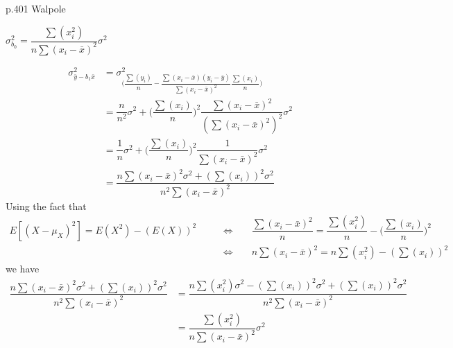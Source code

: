 p.401 Walpole\\[2ex]
\begin{center}
    $\sigma_{b_{0}}^{2} = \dfrac{\sum(x_{i}^{2})}{n\sum(x_{i} - \bar{x})^{2}}\sigma^{2}$
\end{center}
\begin{align*}
    \sigma_{\bar{y} - b_{1}\bar{x}}^{2} &= \sigma_{\Big(\dfrac{\sum(y_{i})}{n} - \dfrac{\sum(x_{i} - \bar{x})(y_{i} - \bar{y})}{\sum(x_{i} - \bar{x})^{2}}\dfrac{\sum(x_{i})}{n}\Big)}^{2}\\[1ex]
    &= \dfrac{n}{n^{2}}\sigma^{2} + \Big(\dfrac{\sum(x_{i})}{n}\Big)^{2}\dfrac{\sum(x_{i} - \bar{x})^{2}}{(\sum(x_{i} - \bar{x})^{2})^{2}}\sigma^{2}\\[1ex]
    &= \dfrac{1}{n}\sigma^{2} + \Big(\dfrac{\sum(x_{i})}{n}\Big)^{2}\dfrac{1}{\sum(x_{i} - \bar{x})^{2}}\sigma^{2}\\[1ex]
    &= \dfrac{n\sum(x_{i} - \bar{x})^{2}\sigma^{2} + (\sum(x_{i}))^{2}\sigma^{2}}{n^{2}\sum(x_{i} - \bar{x})^{2}}
\end{align*}
Using the fact that
\begin{align*}
    E[(X - \mu_{X})^{2}] = E(X^{2}) - (E(X))^{2} \hspace{20pt} &\Longleftrightarrow \hspace{20pt} \dfrac{\sum(x_{i} - \bar{x})^{2}}{n} = \dfrac{\sum(x_{i}^{2})}{n} - \Big(\dfrac{\sum(x_{i})}{n}\Big)^{2}\\[1ex]
    &\Longleftrightarrow \hspace{20pt} n\sum(x_{i} - \bar{x})^{2} = n\sum(x_{i}^{2}) - (\sum(x_{i}))^{2}
\end{align*}
we have
\begin{align*}
    \dfrac{n\sum(x_{i} - \bar{x})^{2}\sigma^{2} + (\sum(x_{i}))^{2}\sigma^{2}}{n^{2}\sum(x_{i} - \bar{x})^{2}} &= \dfrac{n\sum(x_{i}^{2})\sigma^{2} - (\sum(x_{i}))^{2}\sigma^{2} + (\sum(x_{i}))^{2}\sigma^{2}}{n^{2}\sum(x_{i} - \bar{x})^{2}}\\[1ex]
    &= \dfrac{\sum(x_{i}^{2})}{n\sum(x_{i} - \bar{x})^{2}}\sigma^{2}
\end{align*}



